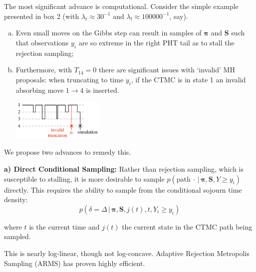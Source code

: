 \documentclass[final,a1paper]{baposter}
\begin{document}
\begin{poster}
{\begin{multicols}{2}
		The most significant advance is computational.  Consider the simple example presented in box 2 (with $\lambda_\mathrm{r} \approx 30^{-1}$ and $\lambda_\mathrm{f} \approx 100000^{-1}$, say).
		\begin{enumerate}[a)]
			\item Even small moves on the Gibbs step can result in samples of $\boldsymbol{\pi}$ and $\mathbf{S}$ such that observations $y_i$ are so extreme in the right PHT tail as to stall the rejection sampling;
			\item Furthermore, with $T_{14}=0$ there are significant issues with `invalid' MH proposals: when truncating to time $y_i$, if the CTMC is in state 1 an invalid absorbing move $1 \to 4$ is inserted.%
		\begin{center}\includegraphics[width=0.35\textwidth]{Truncation}\end{center}
		\end{enumerate}
		
		\vspace{-0.5em}
		We propose two advances to remedy this.
		
		\vspace{0.5em}
		\textbf{a) Direct Conditional Sampling:} Rather than rejection sampling, which is susceptible to stalling, it is more desirable to sample $p(\mathrm{path\ \cdot} \,|\, \boldsymbol{\pi}, \mathbf{S}, Y \ge y_i)$ directly.  This requires the ability to sample from the conditional sojourn time density:
		\vspace{-0.5em}
		\[ p(\delta = \Delta \,|\, \boldsymbol{\pi}, \mathbf{S}, j(t), t, Y_i \ge y_i) \]
		
		\vspace{-0.5em}
		where $t$ is the current time and $j(t)$ the current state in the CTMC path being sampled.
		
		\columnbreak
		
		This is nearly log-linear, though not log-concave.  Adaptive Rejection Metropolis Sampling (ARMS) has proven highly efficient.
		

\end{multicols}}
\end{poster}
\end{document}
